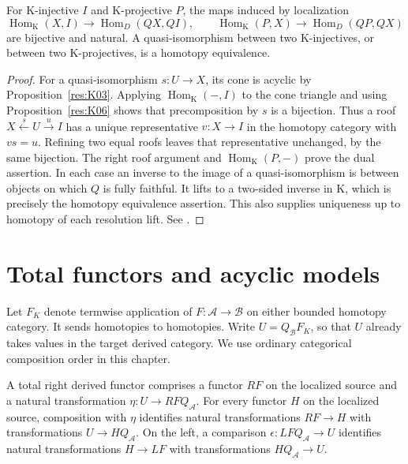 \begin{theorem}\label{res:R04}
For K-injective \(I\) and K-projective \(P\), the maps induced by
localization
\[
 \operatorname{Hom}_{\mathrm K}(X,I)\longrightarrow
     \operatorname{Hom}_{D}(QX,QI),\qquad
 \operatorname{Hom}_{\mathrm K}(P,X)\longrightarrow
     \operatorname{Hom}_{D}(QP,QX)
\]
are bijective and natural. A quasi-isomorphism between two K-injectives,
or between two K-projectives, is a homotopy equivalence.
\end{theorem}
\begin{proof}
For a quasi-isomorphism \(s:U\to X\), its cone is acyclic by
Proposition~\ref{res:K03}. Applying \(\operatorname{Hom}_{\mathrm K}(-,I)\)
to the cone triangle and using Proposition~\ref{res:K06} shows that
precomposition by \(s\) is a bijection. Thus a roof
\(X\xleftarrow{s}U\xrightarrow{u} I\) has a unique representative
\(v:X\to I\) in the homotopy category with \(vs=u\).
Refining two equal roofs leaves that representative unchanged, by the
same bijection. The right roof argument and
\(\operatorname{Hom}_{\mathrm K}(P,-)\) prove the dual assertion.
In each case an inverse to the image of a quasi-isomorphism is between
objects on which \(Q\) is fully faithful. It lifts to a two-sided inverse
in \(\mathrm K\), which is precisely the homotopy equivalence assertion.
This also supplies uniqueness up to homotopy of each resolution lift.
See \cite[Tags 05TG, 064B]{stacks-derived}.
\end{proof}

\section{Total functors and acyclic models}

Let \(F_K\) denote termwise application of \(F:\mathcal A\to\mathcal B\)
on either bounded homotopy category. It sends homotopies to homotopies.
Write \(U=Q_{\mathcal B}F_K\), so that \(U\) already takes values in the
target derived category. We use ordinary categorical composition order in
this chapter.

\begin{definition}
\label{res:R05}
A total right derived functor comprises a functor \(RF\) on the
localized source and a natural transformation \(\eta:U\to RF Q_{\mathcal A}\).
For every functor \(H\) on the localized source, composition with \(\eta\)
identifies natural transformations \(RF\to H\) with transformations
\(U\to H Q_{\mathcal A}\). On the left, a comparison \(\epsilon:LF Q_{\mathcal A}\to U\)
identifies natural transformations \(H\to LF\) with transformations
\(H Q_{\mathcal A}\to U\).
\end{definition}


